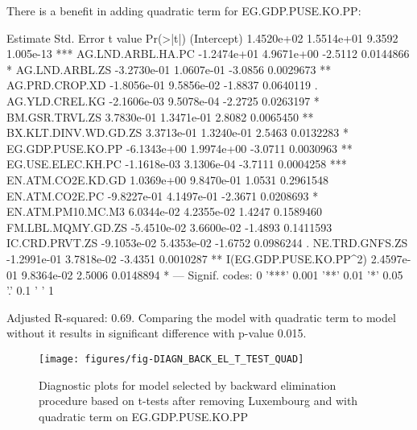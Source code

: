 \documentclass[a4paper]{article}
\begin{document}
There is a benefit in adding quadratic term for EG.GDP.PUSE.KO.PP:
\begin{Schunk}
\begin{Soutput}
                          Estimate  Std. Error t value  Pr(>|t|)    
(Intercept)             1.4520e+02  1.5514e+01  9.3592 1.005e-13 ***
AG.LND.ARBL.HA.PC      -1.2474e+01  4.9671e+00 -2.5112 0.0144866 *  
AG.LND.ARBL.ZS         -3.2730e-01  1.0607e-01 -3.0856 0.0029673 ** 
AG.PRD.CROP.XD         -1.8056e-01  9.5856e-02 -1.8837 0.0640119 .  
AG.YLD.CREL.KG         -2.1606e-03  9.5078e-04 -2.2725 0.0263197 *  
BM.GSR.TRVL.ZS          3.7830e-01  1.3471e-01  2.8082 0.0065450 ** 
BX.KLT.DINV.WD.GD.ZS    3.3713e-01  1.3240e-01  2.5463 0.0132283 *  
EG.GDP.PUSE.KO.PP      -6.1343e+00  1.9974e+00 -3.0711 0.0030963 ** 
EG.USE.ELEC.KH.PC      -1.1618e-03  3.1306e-04 -3.7111 0.0004258 ***
EN.ATM.CO2E.KD.GD       1.0369e+00  9.8470e-01  1.0531 0.2961548    
EN.ATM.CO2E.PC         -9.8227e-01  4.1497e-01 -2.3671 0.0208693 *  
EN.ATM.PM10.MC.M3       6.0344e-02  4.2355e-02  1.4247 0.1589460    
FM.LBL.MQMY.GD.ZS      -5.4510e-02  3.6600e-02 -1.4893 0.1411593    
IC.CRD.PRVT.ZS         -9.1053e-02  5.4353e-02 -1.6752 0.0986244 .  
NE.TRD.GNFS.ZS         -1.2991e-01  3.7818e-02 -3.4351 0.0010287 ** 
I(EG.GDP.PUSE.KO.PP^2)  2.4597e-01  9.8364e-02  2.5006 0.0148894 *  
---
Signif. codes:  0 '***' 0.001 '**' 0.01 '*' 0.05 '.' 0.1 ' ' 1
\end{Soutput}
\end{Schunk}
Adjusted R-squared:
0.69. Comparing the
model with quadratic term to model without it results in significant difference
with p-value 0.015.

\begin{figure}[H]
\begin{center}
\texttt{[image: figures/fig-DIAGN\_BACK\_EL\_T\_TEST\_QUAD]}
\caption{Diagnostic plots for model selected by backward elimination procedure
based on t-tests after removing Luxembourg
and with quadratic term on EG.GDP.PUSE.KO.PP}
\end{center}
\end{figure}
\end{document}
